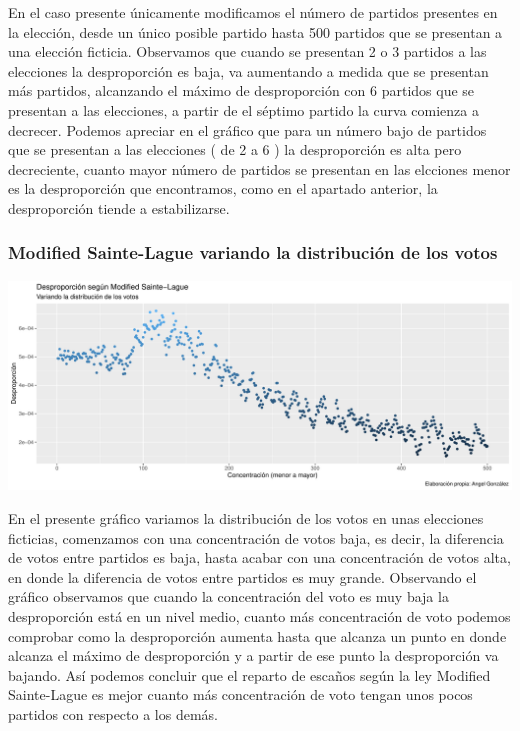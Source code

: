 \documentclass[12pt,a4paper,]{book}
\numberwithin{dummy}{section}
\theoremstyle{ocrenumbox}
\theoremstyle{blacknumex}
\theoremstyle{blacknumbox}
\theoremstyle{ocrenum}
\theoremstyle{ocrenum}
\begin{document}
En el caso presente únicamente modificamos el número de partidos
presentes en la elección, desde un único posible partido hasta 500
partidos que se presentan a una elección ficticia. Observamos que cuando
se presentan 2 o 3 partidos a las elecciones la desproporción es baja,
va aumentando a medida que se presentan más partidos, alcanzando el
máximo de desproporción con 6 partidos que se presentan a las
elecciones, a partir de el séptimo partido la curva comienza a decrecer.
Podemos apreciar en el gráfico que para un número bajo de partidos que
se presentan a las elecciones ( de 2 a 6 ) la desproporción es alta pero
decreciente, cuanto mayor número de partidos se presentan en las
elcciones menor es la desproporción que encontramos, como en el apartado
anterior, la desproporción tiende a estabilizarse.

\hypertarget{modified-sainte-lague-variando-la-distribuciuxf3n-de-los-votos}{%
\subsubsection{Modified Sainte-Lague variando la distribución de los
votos}\label{modified-sainte-lague-variando-la-distribuciuxf3n-de-los-votos}}

\begin{center}\includegraphics[width=0.95\linewidth]{figurasR/unnamed-chunk-21-1} \end{center}

En el presente gráfico variamos la distribución de los votos en unas
elecciones ficticias, comenzamos con una concentración de votos baja, es
decir, la diferencia de votos entre partidos es baja, hasta acabar con
una concentración de votos alta, en donde la diferencia de votos entre
partidos es muy grande. Observando el gráfico observamos que cuando la
concentración del voto es muy baja la desproporción está en un nivel
medio, cuanto más concentración de voto podemos comprobar como la
desproporción aumenta hasta que alcanza un punto en donde alcanza el
máximo de desproporción y a partir de ese punto la desproporción va
bajando. Así podemos concluir que el reparto de escaños según la ley
Modified Sainte-Lague es mejor cuanto más concentración de voto tengan
unos pocos partidos con respecto a los demás.
\end{document}
